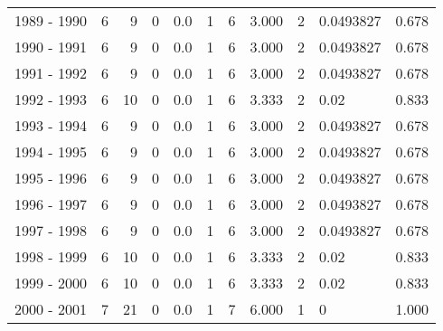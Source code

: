 \begin{tabular}{lrrrrrrrllr}
1989 - 1990 &        6 &        9 &                 0 &               0.0 &                       1 &                          6 &       3.000 &             2 &  0.0493827 &             0.678 \\
1990 - 1991 &        6 &        9 &                 0 &               0.0 &                       1 &                          6 &       3.000 &             2 &  0.0493827 &             0.678 \\
1991 - 1992 &        6 &        9 &                 0 &               0.0 &                       1 &                          6 &       3.000 &             2 &  0.0493827 &             0.678 \\
1992 - 1993 &        6 &       10 &                 0 &               0.0 &                       1 &                          6 &       3.333 &             2 &       0.02 &             0.833 \\
1993 - 1994 &        6 &        9 &                 0 &               0.0 &                       1 &                          6 &       3.000 &             2 &  0.0493827 &             0.678 \\
1994 - 1995 &        6 &        9 &                 0 &               0.0 &                       1 &                          6 &       3.000 &             2 &  0.0493827 &             0.678 \\
1995 - 1996 &        6 &        9 &                 0 &               0.0 &                       1 &                          6 &       3.000 &             2 &  0.0493827 &             0.678 \\
1996 - 1997 &        6 &        9 &                 0 &               0.0 &                       1 &                          6 &       3.000 &             2 &  0.0493827 &             0.678 \\
1997 - 1998 &        6 &        9 &                 0 &               0.0 &                       1 &                          6 &       3.000 &             2 &  0.0493827 &             0.678 \\
1998 - 1999 &        6 &       10 &                 0 &               0.0 &                       1 &                          6 &       3.333 &             2 &       0.02 &             0.833 \\
1999 - 2000 &        6 &       10 &                 0 &               0.0 &                       1 &                          6 &       3.333 &             2 &       0.02 &             0.833 \\
2000 - 2001 &        7 &       21 &                 0 &               0.0 &                       1 &                          7 &       6.000 &             1 &          0 &             1.000 \\

\end{tabular}
